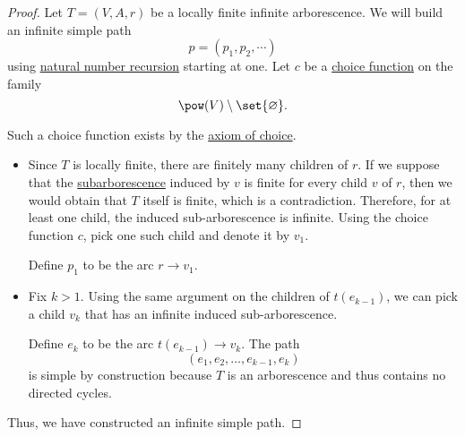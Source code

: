 \begin{proof}
  Let \( T = (V, A, r) \) be a locally finite infinite arborescence. We will build an infinite simple path
  \begin{equation*}
    p = (p_1, p_2, \cdots)
  \end{equation*}
  using \hyperref[rem:natural_number_recursion]{natural number recursion} starting at one. Let \( c \) be a \hyperref[def:choice_function]{choice function} on the family
  \begin{equation*}
    \pow(V) \setminus \set{ \varnothing }.
  \end{equation*}

  Such a choice function exists by the \hyperref[def:zfc/choice]{axiom of choice}.

  \begin{itemize}
    \item Since \( T \) is locally finite, there are finitely many children of \( r \). If we suppose that the \hyperref[def:arborescence/sub-arborescence]{subarborescence} induced by \( v \) is finite for every child \( v \) of \( r \), then we would obtain that \( T \) itself is finite, which is a contradiction. Therefore, for at least one child, the induced sub-arborescence is infinite. Using the choice function \( c \), pick one such child and denote it by \( v_1 \).

    Define \( p_1 \) to be the arc \( r \to v_1 \).

    \item Fix \( k > 1 \). Using the same argument on the children of \( t(e_{k-1}) \), we can pick a child \( v_k \) that has an infinite induced sub-arborescence.

    Define \( e_k \) to be the arc \( t(e_{k-1}) \to v_k \). The path
    \begin{equation*}
      (e_1, e_2, \ldots, e_{k-1}, e_k)
    \end{equation*}
    is simple by construction because \( T \) is an arborescence and thus contains no directed cycles.
  \end{itemize}

  Thus, we have constructed an infinite simple path.
\end{proof}
